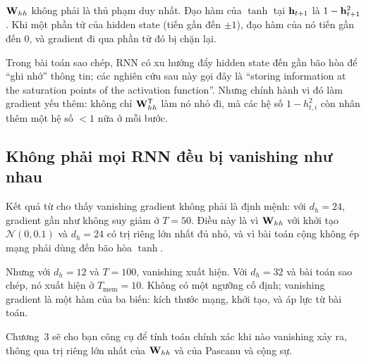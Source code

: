 $\mathbf{W}_{hh}$ không phải là thủ phạm duy nhất. Đạo hàm của $\tanh$ tại
$\mathbf{h}_{t+1}$ là $1 - \mathbf{h}_{t+1}^2$. Khi một phần tử của hidden
state  (tiến gần đến $\pm 1$), đạo hàm của nó tiến gần
đến 0, và
gradient đi qua phần tử đó bị chặn lại.

Trong bài toán sao chép, RNN có xu hướng đẩy hidden state đến gần bão hòa
để ``ghi nhớ'' thông tin; các nghiên cứu sau này gọi đây là \enquote{storing
information at the saturation points of the activation function}. Nhưng chính
hành vi đó làm gradient yếu thêm: không chỉ $\mathbf{W}_{hh}^{\mathsf{T}}$ làm nó
nhỏ đi, mà các hệ số $1 - h_{t,i}^2$ còn nhân thêm một hệ số $< 1$ nữa ở mỗi
bước.

\subsection{Không phải mọi RNN đều bị vanishing như nhau}

Kết quả từ  cho thấy vanishing gradient không
phải là định mệnh:
với $d_h = 24$, gradient gần như không suy giảm ở $T = 50$. Điều này là vì
$\mathbf{W}_{hh}$ với khởi tạo $\mathcal{N}(0, 0.1)$ và $d_h = 24$ có trị riêng
lớn nhất đủ nhỏ, và vì bài toán cộng không ép mạng phải dùng đến bão hòa
$\tanh$.

Nhưng với $d_h = 12$ và $T = 100$, vanishing xuất hiện. Với $d_h = 32$ và
bài toán sao chép, nó xuất hiện ở $T_{\text{mem}} = 10$. Không có một ngưỡng
cố định; vanishing gradient là một hàm của ba biến: kích thước mạng, khởi
tạo, và áp lực từ bài toán.

Chương~3 sẽ cho bạn công cụ để tính toán chính xác khi nào vanishing xảy ra,
thông qua trị riêng lớn nhất của $\mathbf{W}_{hh}$ và
 của Pascanu và cộng sự.
